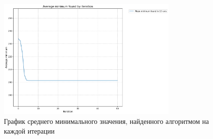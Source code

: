 \documentclass[a4paper,12pt]{extarticle}
\begin{document}
\begin{figure}[ht]
	\centering
	\includegraphics[width=0.8\textwidth]{MeanRuns.png}
	\caption{График среднего минимального значения, найденного алгоритмом на каждой итерации}
	\label{fig:mean_runs}
\end{figure}
\end{document}
